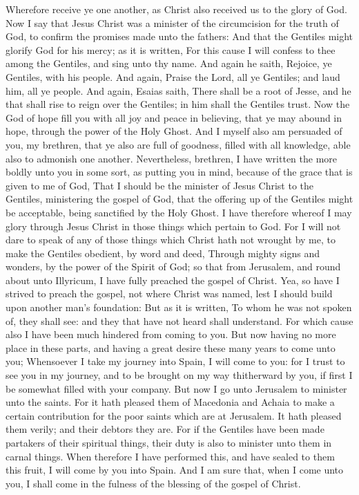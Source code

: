  Wherefore receive ye one another, as Christ also received
us to the glory of God.  Now I say that Jesus Christ was a
minister of the circumcision for the truth of God, to confirm the
promises made unto the fathers:  And that the Gentiles might
glorify God for his mercy; as it is written, For this cause I will
confess to thee among the Gentiles, and sing unto thy name.
 And again he saith, Rejoice, ye Gentiles, with his people.
 And again, Praise the Lord, all ye Gentiles; and laud him,
all ye people.  And again, Esaias saith, There shall be a
root of Jesse, and he that shall rise to reign over the Gentiles; in him
shall the Gentiles trust.  Now the God of hope fill you
with all joy and peace in believing, that ye may abound in hope, through
the power of the Holy Ghost.  And I myself also am
persuaded of you, my brethren, that ye also are full of goodness, filled
with all knowledge, able also to admonish one another. 
Nevertheless, brethren, I have written the more boldly unto you in some
sort, as putting you in mind, because of the grace that is given to me
of God,  That I should be the minister of Jesus Christ to
the Gentiles, ministering the gospel of God, that the offering up of the
Gentiles might be acceptable, being sanctified by the Holy Ghost.
 I have therefore whereof I may glory through Jesus Christ
in those things which pertain to God.  For I will not dare
to speak of any of those things which Christ hath not wrought by me, to
make the Gentiles obedient, by word and deed,  Through
mighty signs and wonders, by the power of the Spirit of God; so that
from Jerusalem, and round about unto Illyricum, I have fully preached
the gospel of Christ.  Yea, so have I strived to preach the
gospel, not where Christ was named, lest I should build upon another
man's foundation:  But as it is written, To whom he was not
spoken of, they shall see: and they that have not heard shall
understand.  For which cause also I have been much hindered
from coming to you.  But now having no more place in these
parts, and having a great desire these many years to come unto you;
 Whensoever I take my journey into Spain, I will come to
you: for I trust to see you in my journey, and to be brought on my way
thitherward by you, if first I be somewhat filled with your company.
 But now I go unto Jerusalem to minister unto the saints.
 For it hath pleased them of Macedonia and Achaia to make a
certain contribution for the poor saints which are at Jerusalem.
 It hath pleased them verily; and their debtors they are.
For if the Gentiles have been made partakers of their spiritual things,
their duty is also to minister unto them in carnal things. 
When therefore I have performed this, and have sealed to them this
fruit, I will come by you into Spain.  And I am sure that,
when I come unto you, I shall come in the fulness of the blessing of the
gospel of Christ.

